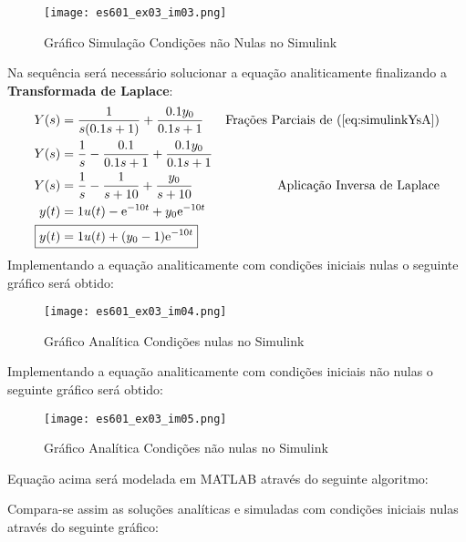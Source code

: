 \documentclass{article}
\begin{document}
\begin{resolution}
\begin{figure}[H]
                        \centering
                        \texttt{[image: es601\_ex03\_im03.png]}
                        \caption{Gráfico Simulação Condições não Nulas no Simulink}
                    \end{figure}
                Na sequência será necessário solucionar a equação analiticamente finalizando a \textbf{Transformada de Laplace}:
                    \begin{align}
                        Y(s) &= \frac{1}{s(0.1s + 1)} + \frac{0.1 y_{0}}{0.1s + 1} & \text{Frações Parciais de (\ref{eq:simulinkYsA})}\nonumber\\
                        Y(s) &= \frac{1}{s} - \frac{0.1}{0.1s + 1} + \frac{0.1y_{0}}{0.1s + 1}\nonumber\\
                        Y(s) &= \frac{1}{s} - \frac{1}{s + 10} + \frac{y_{0}}{s + 10} & \text{Aplicação Inversa de Laplace}\nonumber\\
                        y(t)         &= 1u(t) - \text{e}^{-10t} + y_{0}\text{e}^{-10t}\nonumber\\
                        \Aboxed{y(t) &= 1u(t) + (y_{0} - 1)\text{e}^{-10t}}
                    \end{align}
                Implementando a equação analiticamente com condições iniciais nulas o seguinte gráfico será obtido:
                    \begin{figure}[H]
                        \centering
                        \texttt{[image: es601\_ex03\_im04.png]}
                        \caption{Gráfico Analítica Condições nulas no Simulink}
                    \end{figure}
                Implementando a equação analiticamente com condições iniciais não nulas o seguinte gráfico será obtido:
                    \begin{figure}[H]
                        \centering
                        \texttt{[image: es601\_ex03\_im05.png]}
                        \caption{Gráfico Analítica Condições não nulas no Simulink}
                    \end{figure}
\newpage
                Equação acima será modelada em MATLAB através do seguinte algoritmo:
                    \begin{scriptsize}
                        \myOctave
                        
                    \end{scriptsize}
\newpage
                Compara-se assim as soluções analíticas e simuladas com condições iniciais nulas através do seguinte gráfico:

\end{resolution}
\end{document}
